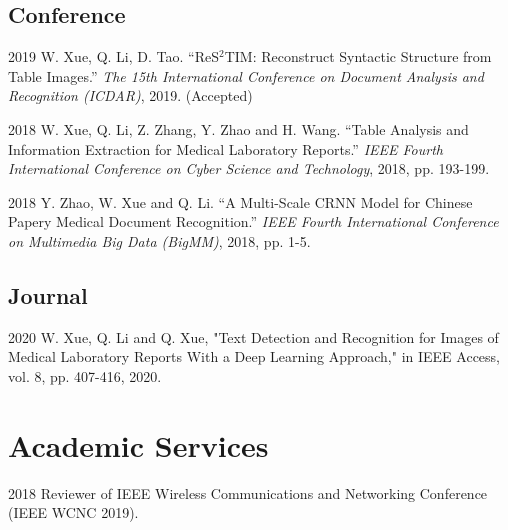 \documentclass[12pt,letterpaper]{report}
\begin{document}
  \subsection*{Conference}

	\begin{tablist}

		\item[2019] \tab W. Xue, Q. Li, D. Tao. \enquote{ReS$^2$TIM: Reconstruct Syntactic Structure from Table Images.} \textit{The 15th International Conference on Document Analysis and Recognition (ICDAR)}, 2019. (Accepted)

		\item[2018] \tab W. Xue, Q. Li, Z. Zhang, Y. Zhao and H. Wang. \enquote{Table Analysis and Information Extraction for Medical Laboratory Reports.} \textit{IEEE Fourth International Conference on Cyber Science and Technology}, 2018, pp. 193-199.

		\item[2018] \tab Y. Zhao, W. Xue and Q. Li. \enquote{A Multi-Scale CRNN Model for Chinese Papery Medical Document Recognition.} \textit{IEEE Fourth International Conference on Multimedia Big Data (BigMM)}, 2018, pp. 1-5.

  \end{tablist}



	\subsection*{Journal}

	\begin{tablist}
		
		\item[2020] \tab W. Xue, Q. Li and Q. Xue, "Text Detection and Recognition for Images of Medical Laboratory Reports With a Deep Learning Approach," in IEEE Access, vol. 8, pp. 407-416, 2020.

	\end{tablist}


  \section*{Academic Services}

	\begin{tablist}
		\item[2018] \tab Reviewer of IEEE Wireless Communications and Networking Conference (IEEE WCNC 2019).
	\end{tablist}
\end{document}
